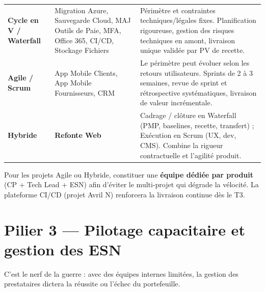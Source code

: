 \documentclass[11pt,a4paper,oneside]{report}
\begin{document}
\vspace{4pt}
\begin{center}
\renewcommand{\arraystretch}{1.5}
\begin{tabularx}{\textwidth}{C{2.8cm} L{5cm} L{6.5cm}}
\toprule
{}
 &  &  \\
\midrule
\textbf{Cycle en V / Waterfall} & Migration Azure, Sauvegarde Cloud, MAJ Outils de Paie, MFA, Office 365, CI/CD, Stockage Fichiers & Périmètre et contraintes techniques/légales fixes. Planification rigoureuse, gestion des risques techniques en amont, livraison unique validée par PV de recette. \\
\textbf{Agile / Scrum} & App Mobile Clients, App Mobile Fournisseurs, CRM & Le périmètre peut évoluer selon les retours utilisateurs. Sprints de 2 à 3 semaines, revue de sprint et rétrospective systématiques, livraison de valeur incrémentale. \\
\textbf{Hybride} & \textbf{Refonte Web} & Cadrage / clôture en Waterfall (PMP, baselines, recette, transfert) ; Exécution en Scrum (UX, dev, CMS). Combine la rigueur contractuelle et l'agilité produit. \\
\bottomrule
\end{tabularx}
\end{center}

\begin{reco}
Pour les projets Agile ou Hybride, constituer une \textbf{équipe dédiée par produit} (CP + Tech Lead + ESN) afin d'éviter le multi-projet qui dégrade la vélocité. La plateforme CI/CD (projet Avril N) renforcera la livraison continue dès le T3.
\end{reco}

\section{Pilier 3 --- Pilotage capacitaire et gestion des ESN}

C'est le nerf de la guerre : avec des équipes internes limitées, la gestion des prestataires dictera la réussite ou l'échec du portefeuille.
\end{document}
